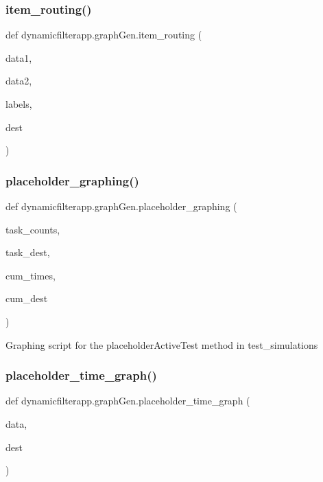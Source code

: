\subsubsection{\texorpdfstring{item\_routing()}{item\_routing()}}
{\footnotesize\ttfamily def dynamicfilterapp.\+graph\+Gen.\+item\+\_\+routing (\begin{DoxyParamCaption}\item[{}]{data1,  }\item[{}]{data2,  }\item[{}]{labels,  }\item[{}]{dest }\end{DoxyParamCaption})}

\mbox{\label{namespacedynamicfilterapp_1_1graph_gen_aa390916522804b2486fb15d5af94c93a}} 
\subsubsection{\texorpdfstring{placeholder\_graphing()}{placeholder\_graphing()}}
{\footnotesize\ttfamily def dynamicfilterapp.\+graph\+Gen.\+placeholder\+\_\+graphing (\begin{DoxyParamCaption}\item[{}]{task\+\_\+counts,  }\item[{}]{task\+\_\+dest,  }\item[{}]{cum\+\_\+times,  }\item[{}]{cum\+\_\+dest }\end{DoxyParamCaption})}

\begin{DoxyVerb}Graphing script for the placeholderActiveTest method in test_simulations
\end{DoxyVerb}
 \mbox{\label{namespacedynamicfilterapp_1_1graph_gen_a96ba3683ba7bda319710d14f7a3e923d}} 
\subsubsection{\texorpdfstring{placeholder\_time\_graph()}{placeholder\_time\_graph()}}
{\footnotesize\ttfamily def dynamicfilterapp.\+graph\+Gen.\+placeholder\+\_\+time\+\_\+graph (\begin{DoxyParamCaption}\item[{}]{data,  }\item[{}]{dest }\end{DoxyParamCaption})}

